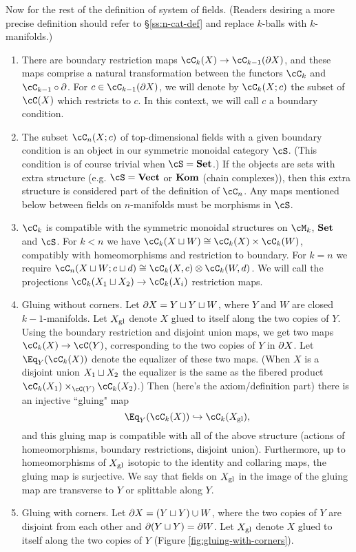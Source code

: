 Now for the rest of the definition of system of fields.
(Readers desiring a more precise definition should refer to \S\ref{ss:n-cat-def}
and replace $k$-balls with $k$-manifolds.)
\begin{enumerate}
\item There are boundary restriction maps $\cC_k(X) \to \cC_{k-1}(\bd X)$, 
and these maps comprise a natural
transformation between the functors $\cC_k$ and $\cC_{k-1}\circ\bd$.
For $c \in \cC_{k-1}(\bd X)$, we will denote by $\cC_k(X; c)$ the subset of 
$\cC(X)$ which restricts to $c$.
In this context, we will call $c$ a boundary condition.
\item The subset $\cC_n(X;c)$ of top-dimensional fields 
with a given boundary condition is an object in our symmetric monoidal category $\cS$.
(This condition is of course trivial when $\cS = \Set$.) 
If the objects are sets with extra structure (e.g. $\cS = \Vect$ or $\Kom$ (chain complexes)), 
then this extra structure is considered part of the definition of $\cC_n$.
Any maps mentioned below between fields on $n$-manifolds must be morphisms in $\cS$.
\item $\cC_k$ is compatible with the symmetric monoidal
structures on $\cM_k$, $\Set$ and $\cS$.
For $k<n$ we have $\cC_k(X \du W) \cong \cC_k(X)\times \cC_k(W)$,
compatibly with homeomorphisms and restriction to boundary.
For $k=n$ we require $\cC_n(X \du W; c\du d) \cong \cC_k(X, c)\ot \cC_k(W, d)$.
We will call the projections $\cC_k(X_1 \du X_2) \to \cC_k(X_i)$
restriction maps.
\item Gluing without corners.
Let $\bd X = Y \du Y \du W$, where $Y$ and $W$ are closed $k{-}1$-manifolds.
Let $X\sgl$ denote $X$ glued to itself along the two copies of $Y$.
Using the boundary restriction and disjoint union
maps, we get two maps $\cC_k(X) \to \cC(Y)$, corresponding to the two
copies of $Y$ in $\bd X$.
Let $\Eq_Y(\cC_k(X))$ denote the equalizer of these two maps.
(When $X$ is a disjoint union $X_1\du X_2$ the equalizer is the same as the fibered product
$\cC_k(X_1)\times_{\cC(Y)} \cC_k(X_2)$.)
Then (here's the axiom/definition part) there is an injective ``gluing" map
\[
	\Eq_Y(\cC_k(X)) \hookrightarrow \cC_k(X\sgl) ,
\]
and this gluing map is compatible with all of the above structure (actions
of homeomorphisms, boundary restrictions, disjoint union).
Furthermore, up to homeomorphisms of $X\sgl$ isotopic to the identity 
and collaring maps,
the gluing map is surjective.
We say that fields on $X\sgl$ in the image of the gluing map
are transverse to $Y$ or splittable along $Y$.
\item Gluing with corners.
Let $\bd X = (Y \du Y) \cup W$, where the two copies of $Y$ 
are disjoint from each other and $\bd(Y\du Y) = \bd W$.
Let $X\sgl$ denote $X$ glued to itself along the two copies of $Y$
(Figure \ref{fig:gluing-with-corners}).
\begin{figure}[t]
\begin{center}
\begin{tikzpicture}


\end{tikzpicture}
\end{center}
\end{figure}
\end{enumerate}
